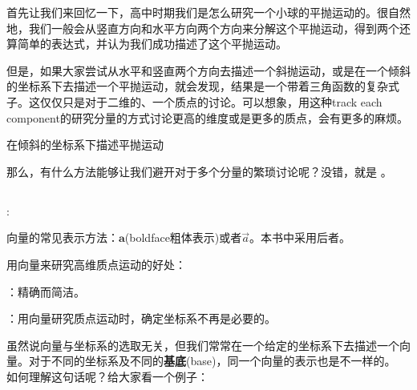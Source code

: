 首先让我们来回忆一下，高中时期我们是怎么研究一个小球的平抛运动的。很自然地，我们一般会从竖直方向和水平方向两个方向来分解这个平抛运动，得到两个还算简单的表达式，并认为我们成功描述了这个平抛运动。

但是，如果大家尝试从水平和竖直两个方向去描述一个斜抛运动，或是在一个倾斜的坐标系下去描述一个平抛运动，就会发现，结果是一个带着三角函数的复杂式子。这仅仅只是对于二维的、一个质点的讨论。可以想象，用这种track each component的研究分量的方式讨论更高的维度或是更多的质点，会有更多的麻烦。
\begin{center}
	在倾斜的坐标系下描述平抛运动
\end{center}

那么，有什么方法能够让我们避开对于多个分量的繁琐讨论呢？没错，就是 。
\subsection[向量]{}
\begin{Itemize}
	\item {}: 
\end{Itemize}

向量的常见表示方法：$\mathbf{a}$(boldface粗体表示)或者$\vec{a}$。本书中采用后者。

用向量来研究高维质点运动的好处：
\begin{Itemize}
    \item {}：精确而简洁。
    \item {}：用向量研究质点运动时，确定坐标系不再是必要的。
\end{Itemize}
虽然说向量与坐标系的选取无关，但我们常常在一个给定的坐标系下去描述一个向量。对于不同的坐标系及不同的\textbf{基底}(base)，同一个向量的表示也是不一样的。
如何理解这句话呢？给大家看一个例子：

